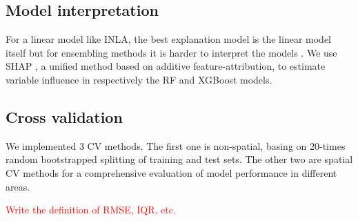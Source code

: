 \documentclass{article}
\begin{document}
\subsection{Model interpretation}
For a linear model like INLA, the best explanation model is the linear model itself but for ensembling methods it is harder to interpret the models \citep{NIPS2017_8a20a862}. We use SHAP \citep[SHapley Additive exPlanations,][]{lundberg2018explainable,NIPS2017_8a20a862}, a unified method based on additive feature-attribution, to estimate variable influence in respectively the RF and XGBoost models.   

\subsection{Cross validation}
We implemented 3 CV methods. The first one is non-spatial, basing on 20-times random bootstrapped splitting of training and test sets. The other two are spatial CV methods for a comprehensive evaluation of model performance in different areas.

\textcolor{red}{Write the definition of RMSE, IQR, etc.}
\end{document}
